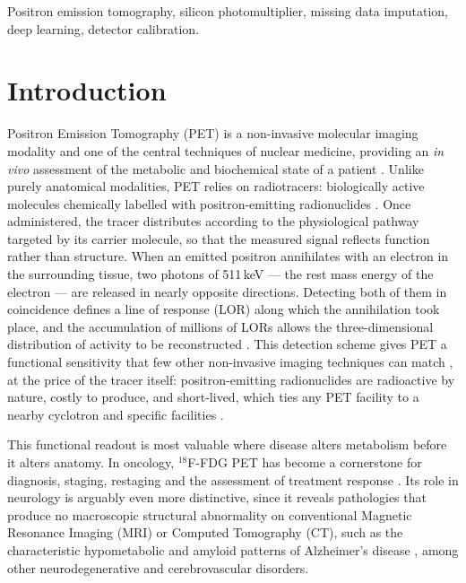\documentclass[10pt,conference]{IEEEtran}
\begin{document}
\begin{IEEEkeywords}
Positron emission tomography, silicon photomultiplier, missing data
imputation, deep learning, detector calibration.
\end{IEEEkeywords}


\section{Introduction}


Positron Emission Tomography (PET) is a non-invasive molecular imaging
modality and one of the central techniques of nuclear medicine, providing
an \textit{in vivo} assessment of the metabolic and biochemical state of a
patient \cite{cherry2012}. Unlike purely anatomical modalities, PET relies
on radiotracers: biologically active molecules chemically labelled with
positron-emitting radionuclides \cite{rong2023}. Once administered, the
tracer distributes according to the physiological pathway targeted by its
carrier molecule, so that the measured signal reflects function rather than
structure. When an emitted positron annihilates with an electron in the
surrounding tissue, two photons of 511\,keV --- the rest mass energy of the
electron --- are released in nearly opposite directions. Detecting both of
them in coincidence defines a line of response (LOR) along which the
annihilation took place, and the accumulation of millions of LORs allows the
three-dimensional distribution of activity to be reconstructed
\cite{cherry2012}. This detection scheme gives PET a functional sensitivity that few other non-invasive imaging techniques can match \cite{vaquero2015}, at the
price of the tracer itself: positron-emitting radionuclides are radioactive
by nature, costly to produce, and short-lived, which ties any PET facility
to a nearby cyclotron and specific facilities \cite{rong2023}.

This functional readout is most valuable where disease alters metabolism
before it alters anatomy. In oncology, $^{18}$F-FDG PET has become a
cornerstone for diagnosis, staging, restaging and the assessment of
treatment response \cite{fletcher2008,boellaard2015}. Its role in neurology
is arguably even more distinctive, since it reveals pathologies that produce
no macroscopic structural abnormality on conventional Magnetic Resonance
Imaging (MRI) or Computed Tomography (CT), such as the characteristic
hypometabolic and amyloid patterns of Alzheimer's disease
\cite{johnson2013}, among other neurodegenerative and cerebrovascular
disorders.
\end{document}
